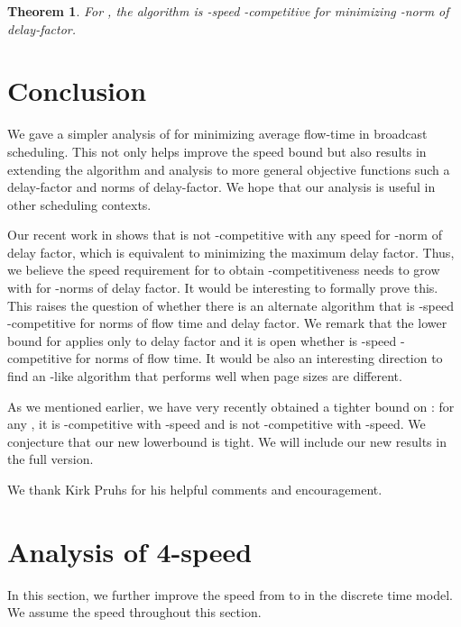 \documentclass[11pt]{article}
\newtheorem{theorem}[lemma]{Theorem}
\begin{document}
\begin{titlepage}
\begin{theorem}
    \label{thm:LP}
    For , the algorithm  is -speed
    -competitive for minimizing -norm of delay-factor.
\end{theorem}

\vspace{-7mm}

\section{Conclusion}\vspace{-3mm}
\label{sec:concl}
We gave a simpler analysis of  for minimizing average flow-time
in broadcast scheduling. This not only helps improve the speed bound
but also results in extending the algorithm and analysis to more
general objective functions such a delay-factor and  norms of
delay-factor. We hope that our analysis is useful in other scheduling
contexts.

Our recent work in \cite{ChekuriIM09} shows that  is not
-competitive with any speed for -norm of delay factor,
which is equivalent to minimizing the maximum delay factor. Thus, we
believe the speed requirement for  to obtain
-competitiveness needs to grow with  for -norms of delay
factor. It would be interesting to formally prove this. This raises
the question of whether there is an alternate algorithm that is
-speed -competitive for  norms of flow time and delay
factor. We remark that the lower bound for  \cite{ChekuriIM09}
applies only to delay factor and it is open whether  is
-speed -competitive for  norms of flow time.
It would be also an interesting direction
to find an -like algorithm that performs well when page sizes are different.

As we mentioned earlier, we have very recently obtained a tighter bound on : 
for any , it is -competitive with -speed and is not -competitive 
with -speed. We conjecture that our new lowerbound is tight. 
We will include our new results in the full version.

\bigskip
{} We thank Kirk Pruhs for his helpful
comments and encouragement.




\appendix



\section{Analysis of 4-speed}

\label{sec:4speed} In this section, we further improve the speed from  to  in the discrete time model. We assume
the speed  throughout this section.


\end{titlepage}
\end{document}
